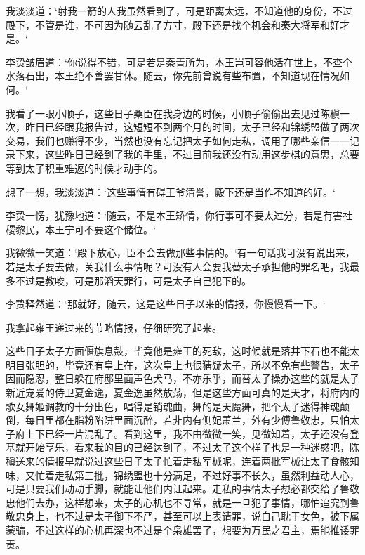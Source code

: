 我淡淡道：‘射我一箭的人我虽然看到了，可是距离太远，不知道他的身份，不过殿下，不管是谁，不可因为随云乱了方寸，殿下还是找个机会和秦大将军和好才是。‘

李贽皱眉道：‘你说得不错，可是若是秦青所为，本王岂可容他活在世上，不查个水落石出，本王绝不善罢甘休。随云，你先前曾说有些布置，不知道现在情况如何。‘

我看了一眼小顺子，这些日子桑臣在我身边的时候，小顺子偷偷出去见过陈稹一次，昨日已经跟我报告过，这短短不到两个月的时间，太子已经和锦绣盟做了两次交易，我们也赚得不少，当然也没有忘记把太子如何走私，调用了哪些亲信一一记录下来，这些昨日已经到了我的手里，不过目前我还没有动用这步棋的意思，总要等到太子积重难返的时候才动手的。

想了一想，我淡淡道：‘这些事情有碍王爷清誉，殿下还是当作不知道的好。‘

李贽一愣，犹豫地道：‘随云，不是本王矫情，你行事可不要太过分，若是有害社稷黎民，本王宁可不要这个储位。‘

我微微一笑道：‘殿下放心，臣不会去做那些事情的。‘有一句话我可没有说出来，若是太子要去做，关我什么事情呢？可没有人会要我替太子承担他的罪名吧，我最多不过是教唆，可是那滔天罪行，可是太子自己犯下的。

李贽释然道：‘那就好，随云，这是这些日子以来的情报，你慢慢看一下。‘

我拿起雍王递过来的节略情报，仔细研究了起来。

这些日子太子方面偃旗息鼓，毕竟他是雍王的死敌，这时候就是落井下石也不能太明目张胆的，毕竟还有皇上在，这次皇上也很猜疑太子，所以不免有些警告，太子因而隐忍，整日躲在府邸里面声色犬马，不亦乐乎，而替太子操办这些的就是太子新近宠爱的侍卫夏金逸，夏金逸虽然放荡，但是这些方面可真的是天才，将府内的歌女舞姬调教的十分出色，唱得是销魂曲，舞的是天魔舞，把个太子迷得神魂颠倒，每日里都在脂粉陷阱里面沉醉，若非内有侧妃萧兰，外有少傅鲁敬忠，只怕太子府上下已经一片混乱了。看到这里，我不由微微一笑，见微知着，太子还没有登基就开始享乐，看来我的目的已经达到了，不过太子这个样子也是一种迷惑吧，陈稹送来的情报早就说过这些日子太子忙着走私军械呢，连着两批军械让太子食骸知味，又忙着走私第三批，锦绣盟也十分满足，不过好事不长久，虽然利益动人心，可是只要我们动动手脚，就能让他们内讧起来。走私的事情太子想必都交给了鲁敬忠他们去办，这样想来，太子的心机也不寻常，就是一旦犯了事情，哪怕追究到鲁敬忠身上，也不过是太子御下不严，甚至可以上表请罪，说自己耽于女色，被下属蒙骗，不过这样的心机再深也不过是个枭雄罢了，想要为万民之君主，焉能推诿罪责。

